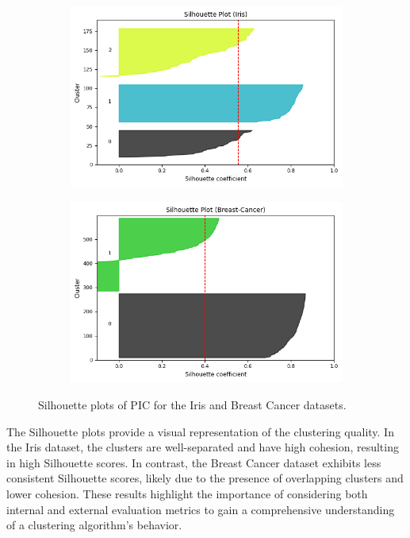 \begin{figure}[htb]
    \centering
    \begin{subfigure}[b]{0.49\textwidth}
        \centering
        \includegraphics[width=\textwidth]{../results/plots/Iris.png}
    \end{subfigure}
    \hfill
    \begin{subfigure}[b]{0.49\textwidth}
        \centering
        \includegraphics[width=\textwidth]{../results/plots/Breast-Cancer.png}
    \end{subfigure}

    \caption{Silhouette plots of PIC for the Iris and Breast Cancer datasets.}
    \label{fig:silhouette}
\end{figure}

The Silhouette plots provide a visual representation of the clustering quality. In the Iris dataset, the clusters are well-separated and have high cohesion, resulting in high Silhouette scores. In contrast, the Breast Cancer dataset exhibits less consistent Silhouette scores, likely due to the presence of overlapping clusters and lower cohesion. These results highlight the importance of considering both internal and external evaluation metrics to gain a comprehensive understanding of a clustering algorithm's behavior.

